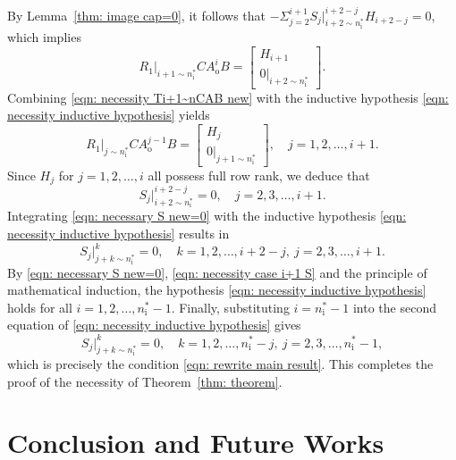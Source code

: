 \documentclass[sort&compress]{elsarticle}
\newcommand\Ao{A_\mathrm o}
\newcommand\nsharp{n_\mathrm i^*}
\begin{document}
By Lemma~\ref{thm: image cap=0}, it follows that
$- \Sigma_{j=2}^{i+1} S_j|_{i+2\sim\nsharp}^{i+2-j} H_{i+2-j} = 0$,
which implies
\begin{equation}\label{eqn: necessity Ti+1~nCAB new}
R_1|_{i+1\sim\nsharp} C \Ao^{i} B
= \begin{bmatrix} H_{i+1} \\ 0|_{i+2\sim\nsharp} \end{bmatrix}.
\end{equation}
Combining \eqref{eqn: necessity Ti+1~nCAB new} with the inductive hypothesis
\eqref{eqn: necessity inductive hypothesis} yields
\begin{equation}\label{eqn: necessity case i+1 TCAB}
R_1|_{j\sim\nsharp} C \Ao^{j-1} B
= \begin{bmatrix} H_j \\ 0|_{j+1\sim\nsharp} \end{bmatrix},
\quad j = 1, 2, \dots, i+1.
\end{equation}
Since $H_j$ for $j = 1, 2, \dots, i$ all possess full row rank,
we deduce that
\begin{equation}\label{eqn: necessary S new=0}
S_j|^{i+2-j}_{i+2\sim\nsharp} = 0, \quad j = 2, 3, \dots, i+1.
\end{equation}
Integrating \eqref{eqn: necessary S new=0} with the inductive hypothesis
\eqref{eqn: necessity inductive hypothesis} results in
\begin{equation}\label{eqn: necessity case i+1 S}
S_j|_{j+k\sim\nsharp}^k = 0, \quad k = 1, 2, \dots, i+2-j, \ j = 2, 3, \dots, i+1.
\end{equation}
By \eqref{eqn: necessary S new=0}, \eqref{eqn: necessity case i+1 S} and
the principle of mathematical induction, the hypothesis
\eqref{eqn: necessity inductive hypothesis} holds for all $i = 1, 2, \dots, \nsharp-1$.
Finally, substituting $i = \nsharp-1$ into the second equation of
\eqref{eqn: necessity inductive hypothesis} gives
\[
S_j|_{j+k\sim\nsharp}^k = 0, \quad
k = 1, 2, \dots, \nsharp-j, \
j = 2, 3, \dots, \nsharp-1,
\]
which is precisely the condition \eqref{eqn: rewrite main result}.
This completes the proof of the necessity of Theorem~\ref{thm: theorem}.

\section{Conclusion and Future Works}
\end{document}

